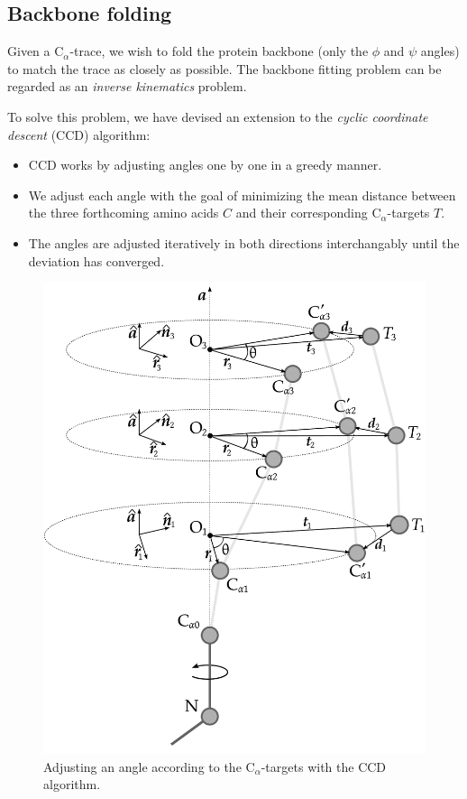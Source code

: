 \documentclass[a0,portrait]{a0poster}
\newcommand{\Ca}{C$_{\alpha}${}}
\begin{document}
\begin{GridBlock}{0}{72.3}{49}
\begin{multicols}{2}
\section{Backbone folding}

Given a \Ca-trace, we wish to fold the protein backbone (only the
$\phi$ and $\psi$ angles) to match the trace as closely as possible.
The backbone fitting problem can be regarded as an \emph{inverse
  kinematics} problem.

To solve this problem, we have devised an extension to the
\emph{cyclic coordinate descent} (CCD) algorithm:
\begin{itemize}
	\item CCD works by adjusting angles one by one in a greedy manner.
	\item We adjust each angle with the goal of minimizing the mean
    distance between the three forthcoming amino acids $C$ and their
    corresponding \Ca-targets $T$.
	\item The angles are adjusted iteratively in both directions
    interchangably until the deviation has converged.
\end{itemize}

\begin{figure}
  \centering
	\includegraphics[width=0.85\columnwidth]{exampleposter-figures/ccd}
  \caption{Adjusting an angle according to the \Ca-targets with the CCD algorithm.}
  \label{fig:ccd}
\end{figure}
\end{multicols}
\end{GridBlock}
\end{document}
